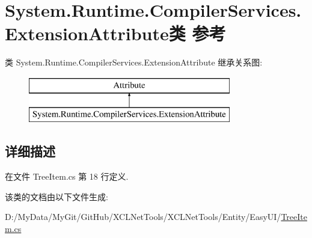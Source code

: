 \hypertarget{class_system_1_1_runtime_1_1_compiler_services_1_1_extension_attribute}{\section{System.\-Runtime.\-Compiler\-Services.\-Extension\-Attribute类 参考}
\label{class_system_1_1_runtime_1_1_compiler_services_1_1_extension_attribute}
}
类 System.\-Runtime.\-Compiler\-Services.\-Extension\-Attribute 继承关系图\-:\begin{figure}[H]
\begin{center}
\leavevmode
\includegraphics[height=2.000000cm]{class_system_1_1_runtime_1_1_compiler_services_1_1_extension_attribute}
\end{center}
\end{figure}


\subsection{详细描述}


在文件 Tree\-Item.\-cs 第 18 行定义.



该类的文档由以下文件生成\-:\begin{DoxyCompactItemize}
\item 
D\-:/\-My\-Data/\-My\-Git/\-Git\-Hub/\-X\-C\-L\-Net\-Tools/\-X\-C\-L\-Net\-Tools/\-Entity/\-Easy\-U\-I/\hyperlink{_tree_item_8cs}{Tree\-Item.\-cs}\end{DoxyCompactItemize}
